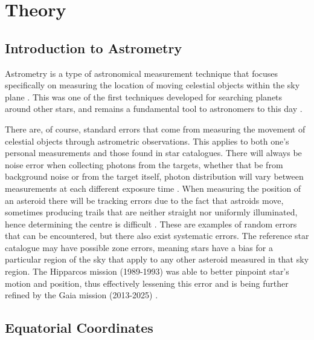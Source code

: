 \documentclass[12pt]{article}
\begin{document}

\setcounter{page}{1}
\section{Theory} \label{sec:1}

\subsection{Introduction to Astrometry}

Astrometry is a type of astronomical measurement technique that focuses specifically on measuring the location of moving celestial objects within the sky plane \cite{ENDL2007887}.
This was one of the first techniques developed for searching planets around other stars, and remains a fundamental tool to astronomers to this day \cite{UCDastrometry,ENDL2007887}.

There are, of course, standard errors that come from measuring the movement of celestial objects through astrometric observations. This applies to both one's personal measurements and those found in star catalogues.
There will always be noise error when collecting photons from the targets, whether that be from background noise or from the target itself, photon distribution will vary between measurements at each different exposure time \cite{owen2000error}.
When measuring the position of an asteroid there will be tracking errors due to the fact that astroids move, sometimes producing trails that are neither straight nor uniformly illuminated, hence determining the centre is difficult \cite{owen2000error}.
These are examples of random errors that can be encountered, but there also exist systematic errors. The reference star catalogue may have possible zone errors, meaning stars have a bias for a particular region
of the sky that apply to any other asteroid measured in that sky region. The Hipparcos mission (1989-1993) was able to better pinpoint star's motion and position, thus effectively lessening this error \cite{owen2000error} and is being further
refined by the Gaia mission (2013-2025) \cite{hipparcos,gaiaesa}.

\subsection{Equatorial Coordinates}
\end{document}
